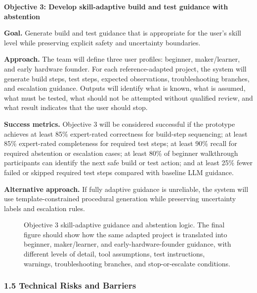 \textbf{Objective 3: Develop skill-adaptive build and test guidance with abstention}

\textbf{Goal.} Generate build and test guidance that is appropriate for the user's skill level while preserving explicit safety and uncertainty boundaries.

\textbf{Approach.} The team will define three user profiles: beginner, maker/learner, and early hardware founder. For each reference-adapted project, the system will generate build steps, test steps, expected observations, troubleshooting branches, and escalation guidance. Outputs will identify what is known, what is assumed, what must be tested, what should not be attempted without qualified review, and what result indicates that the user should stop.

\textbf{Success metrics.} Objective 3 will be considered successful if the prototype achieves at least 85\% expert-rated correctness for build-step sequencing; at least 85\% expert-rated completeness for required test steps; at least 90\% recall for required abstention or escalation cases; at least 80\% of beginner walkthrough participants can identify the next safe build or test action; and at least 25\% fewer failed or skipped required test steps compared with baseline LLM guidance.

\textbf{Alternative approach.} If fully adaptive guidance is unreliable, the system will use template-constrained procedural generation while preserving uncertainty labels and escalation rules.

\begin{figure}[H]
\centering
{}
\caption{Objective 3 skill-adaptive guidance and abstention logic. The final figure should show how the same adapted project is translated into beginner, maker/learner, and early-hardware-founder guidance, with different levels of detail, tool assumptions, test instructions, warnings, troubleshooting branches, and stop-or-escalate conditions.}
\label{fig:objective3_skill_guidance}
\end{figure}

\subsubsection*{1.5 Technical Risks and Barriers}

